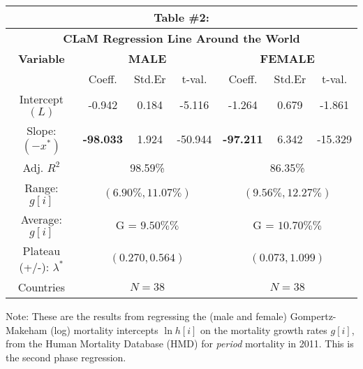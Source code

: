 \documentclass[12pt, titlepage]{article}%
\begin{document}
\clearpage
\begin{table}
\begin{center}
\begin{tabular}{||c||c|c|c|c|c|c||}\hline\hline
\multicolumn{7}{||c||}{Table \#2:} \\ \hline
\multicolumn{7}{||c||}{{\bf CLaM Regression Line Around the World}} \\ \hline
{\bf Variable} & \multicolumn{3}{|c|}{{\bf MALE}} & \multicolumn{3}{|c||}{{\bf FEMALE}} \\ \hline
& Coeff. & Std.Er & t-val. & Coeff. & Std.Er & t-val.  \\ \hline
Intercept $(L)$ & -0.942 & 0.184 & -5.116 & -1.264 & 0.679 & -1.861 \\ \hline
Slope: $(-x^{*})$ & {\bf-98.033} & 1.924 & -50.944 & {\bf-97.211} & 6.342 & -15.329 \\ \hline
Adj. $R^2$ & \multicolumn{3}{|c|}{98.59\%} & \multicolumn{3}{|c||}{86.35\%} \\ \hline
Range: $g[i]$ & \multicolumn{3}{|c|}{$(6.90\%, 11.07\%)$} & \multicolumn{3}{|c||}{$(9.56\%, 12.27\%)$} \\ \hline
Average: $g[i]$ & \multicolumn{3}{|c|}{G \; = \; $9.50\%\%$} & \multicolumn{3}{|c||}{G \; = \; $10.70\%\%$} \\ \hline
Plateau (+/-): $\lambda^{*}$ & \multicolumn{3}{|c|}{$ (0.270, 0.564)$} & \multicolumn{3}{|c||}{$ (0.073, 1.099)$} \\ \hline
Countries & \multicolumn{3}{|c|}{$N=38$} & \multicolumn{3}{|c||}{$N=38$} \\ \hline
\end{tabular}\label{tab3}\end{center}Note: These are the results from regressing the (male and female) Gompertz-Makeham (log) mortality intercepts $\ln h[i]$ on the mortality growth rates $g[i]$, from the Human Mortality Database (HMD) for {\em period} mortality in 2011. This is the second phase regression.
\end{table}
\end{document}

